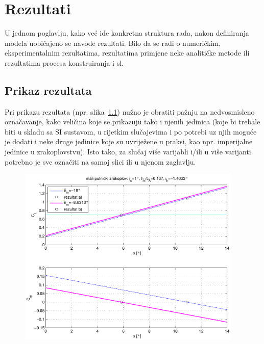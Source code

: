 \chapter{Rezultati}
U jednom poglavlju, kako već ide konkretna struktura rada, nakon definiranja
modela uobičajeno se navode rezultati. Bilo da se radi o numeričkim,
eksperimentalnim rezultatima, rezultatima primjene neke analitičke metode ili
rezultatima procesa konstruiranja i sl.

\section{Prikaz rezultata}
Pri prikazu rezultata (npr. slika~\ref{fig:rez}) nužno je obratiti pažnju na
nedvosmisleno označavanje, 
kako veličina koje se prikazuju tako i njenih jedinica (koje bi trebale biti u
skladu sa SI sustavom, u rijetkim slučajevima i po potrebi uz njih moguće je dodati i neke druge
jedinice koje su uvriježene u praksi, kao npr. imperijalne jedinice u
zrakoplovstvu). Isto tako, za slučaj više varijabli i/ili u više varijanti
potrebno je sve označiti na samoj slici ili u njenom zaglavlju.
\begin{figure}
  \centering
  \includegraphics[width=0.95\textwidth]{rezultat}\\
  \label{fig:rez}
\end{figure}

